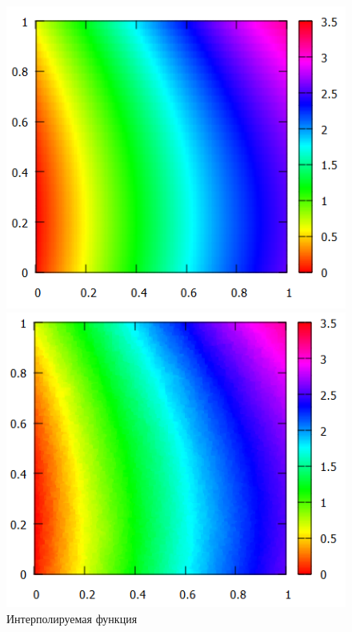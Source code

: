 \documentclass[14pt, a4paper]{extarticle}
\begin{document}
\begin{enumerate}
			\begin{figure}[H]
				\begin{minipage}{0.5\textwidth}
					\centering
					\includegraphics[width = \linewidth]{../1func/imOrig1.png}
					\caption[.] {Интерполируемая функция}
				\end{minipage}\hfill
				\begin{minipage}{0.5\textwidth}
					\centering
					\includegraphics[width = \linewidth]{../1func/M=10T=5774Err=0.008963.png}

\end{minipage}
\end{figure}
\end{enumerate}
\end{document}
